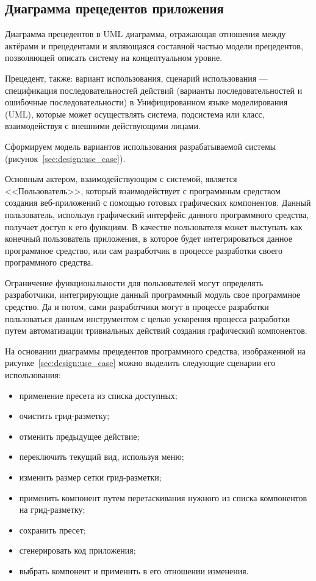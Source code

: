 \subsection{Диаграмма прецедентов приложения}
\label{sec:design:use_case_diagram}

Диаграмма прецедентов в UML диаграмма, отражающая отношения между актёрами и прецедентами и являющаяся составной частью модели прецедентов, позволяющей описать систему на концептуальном уровне.

Прецедент, также: вариант использования, сценарий использования — спецификация последовательностей действий (варианты последовательностей и ошибочные последовательности) в Унифицированном языке моделирования (UML), которые может осуществлять система, подсистема или класс, взаимодействуя с внешними действующими лицами.

Сформируем модель вариантов использования разрабатываемой системы (рисунок~\ref{sec:design:use_case}).

Основным актером, взаимодействующим с системой, является <<Пользователь>>, который взаимодействует с программным средством создания веб-приложений с помощью 
готовых графических компонентов. Данный пользователь, используя графический интерфейс данного программного средства, получает доступ к его функциям. В качестве пользователя может выступать как конечный пользователь приложения, в которое будет интегрироваться данное программное средство, или сам разработчик в процессе разработки своего программного средства.

Ограничение функциональности для пользователей могут определять разработчики, интегрирующие данный программный модуль свое программное средство. Да и потом, сами разработчики могут в процессе разработки пользоваться данным инструментом с целью ускорения процесса разработки путем автоматизации тривиальных действий создания графический компонентов.\pagebreak

На основании диаграммы прецедентов программного средства, изображенной на рисунке~\ref{sec:design:use_case} можно выделить следующие сценарии его использования:
\begin{itemize}
    \item применение пресета из списка доступных;
    \item очистить грид-разметку;
    \item отменить предыдущее действие;
    \item переключить текущий вид, используя меню;
    \item изменить размер сетки грид-разметки;
    \item применить компонент путем перетаскивания нужного из списка компонентов на грид-разметку;
    \item сохранить пресет;
    \item сгенерировать код приложения;
    \item выбрать компонент и применить в его отношении изменения.
\end{itemize}

